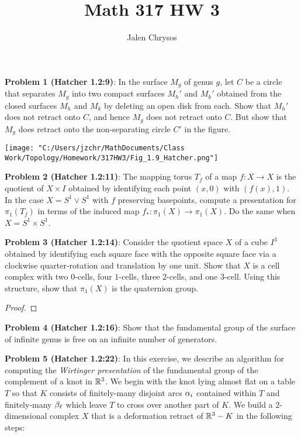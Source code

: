 \documentclass{amsart}
\title{Math 317 HW 3}
\author{Jalen Chrysos}
\begin{document}
	\maketitle

\textbf{Problem 1 (Hatcher 1.2:9)}: In the surface $M_g$ of genus $g$, let $C$ be a circle that separates $M_g$ into two compact surfaces $M_h'$ and $M_k'$ obtained from the closed surfaces $M_h$ and $M_k$ by deleting an open disk from each. Show that $M_h'$ does not retract onto $C$, and hence $M_g$ does not retract onto $C$. But show that $M_g$ does retract onto the non-separating circle $C'$ in the figure.

\begin{center}
\texttt{[image: "C:/Users/jzchr/MathDocuments/Class Work/Topology/Homework/317HW3/Fig\_1.9\_Hatcher.png"]}
\end{center}

\newpage
\textbf{Problem 2 (Hatcher 1.2:11)}: The mapping torus $T_f$ of a map $f:X\to X$ is the quotient of $X\times I$ obtained by identifying each point $(x,0)$ with $(f(x),1)$. In the case $X=S^1\vee S^1$ with $f$ preserving basepoints, compute a presentation for $\pi_1(T_f)$ in terms of the induced map $f_*:\pi_1(X)\to\pi_1(X)$. Do the same when $X=S^1\times S^1$.

\newpage
\textbf{Problem 3 (Hatcher 1.2:14)}: Consider the quotient space $X$ of a cube $I^3$ obtained by identifying each square face with the opposite square face via a clockwise quarter-rotation and translation by one unit. Show that $X$ is a cell complex with two $0$-cells, four $1$-cells, three $2$-cells, and one $3$-cell. Using this structure, show that $\pi_1(X)$ is the quaternion group.
\begin{proof}
	
\end{proof}

\newpage 
\textbf{Problem 4 (Hatcher 1.2:16)}: Show that the fundamental group of the surface of infinite genus is free on an infinite number of generators.

\newpage
\textbf{Problem 5 (Hatcher 1.2:22)}: In this exercise, we describe an algorithm for computing the \textit{Wirtinger presentation} of the fundamental group of the complement of a knot in $\mathbb{R}^3$. We begin with the knot lying almost flat on a table $T$ so that $K$ consists of finitely-many disjoint arcs $\alpha_i$ contained within $T$ and finitely-many $\beta_{\ell}$ which leave $T$ to cross over another part of $K$. We build a 2-dimensional complex $X$ that is a deformation retract of $\mathbb{R}^3-K$ in the following steps:\\
\end{document}
